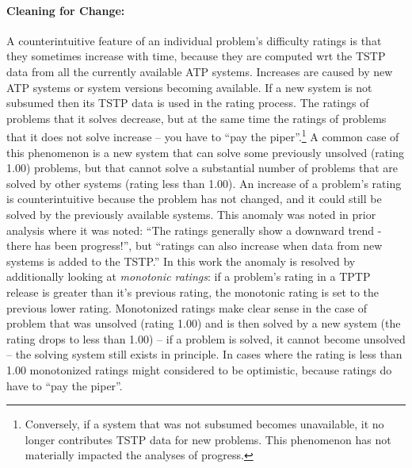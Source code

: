 \documentclass[runningheads]{llncs}
\begin{document}
\paragraph{Cleaning for Change:}
A counterintuitive feature of an individual problem's difficulty ratings is that they sometimes 
increase with time, because they are computed wrt the TSTP data from all the currently available
ATP systems.
Increases are caused by new ATP systems or system versions becoming available.
If a new system is not subsumed then its TSTP data is used in the rating process.
The ratings of problems that it solves decrease, but at the same time the ratings of problems that 
it does not solve increase -- you have to ``pay the piper''.\footnote{%
Conversely, if a system that was not subsumed becomes unavailable, it no longer contributes
TSTP data for new problems.
This phenomenon has not materially impacted the analyses of progress.} 
A common case of this phenomenon is a new system that can solve some previously unsolved
(rating 1.00) problems, but that cannot solve a substantial number of problems that are solved
by other systems (rating less than 1.00).
An increase of a problem's rating is counterintuitive because the problem has not changed, and 
it could still be solved by the previously available systems.
This anomaly was noted in prior analysis \cite{Sut17} where it was noted: ``The ratings generally 
show a downward trend - there has been progress!'', but ``ratings can also increase when data 
from new systems is added to the TSTP.''
In this work the anomaly is resolved by additionally looking at {\em monotonic ratings}:
if a problem's rating in a TPTP release is greater than it's previous rating, the monotonic 
rating is set to the previous lower rating.
Monotonized ratings make clear sense in the case of problem that was unsolved (rating 1.00) and 
is then solved by a new system (the rating drops to less than 1.00) -- if a problem is 
solved, it cannot become unsolved -- the solving system still exists in principle.
In cases where the rating is less than 1.00 monotonized ratings might considered to be 
optimistic, because ratings do have to ``pay the piper''.

\end{document}
